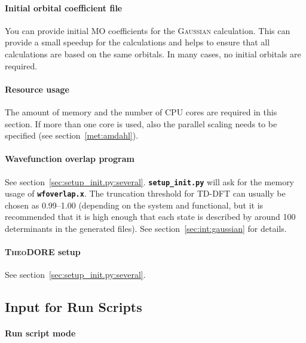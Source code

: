 \documentclass[a4paper,10pt,DIV=15,openany,twoside=false]{scrbook}
\newcommand{\ttt}[1]{\textbf{\texttt{#1}}}
\begin{document}
\paragraph{Initial orbital coefficient file}

You can provide initial MO coefficients for the \textsc{Gaussian} calculation. This can provide a small speedup for the calculations and helps to ensure that all calculations are based on the same orbitals.
In many cases, no initial orbitals are required.

\paragraph{Resource usage}

The amount of memory and the number of CPU cores are required in this section. If more than one core is used, also the parallel scaling needs to be specified (see section~\ref{met:amdahl}).

\paragraph{Wavefunction overlap program}

See section~\ref{sec:setup_init.py:several}. \ttt{setup\_init.py} will ask for the memory usage of \ttt{wfoverlap.x}. The truncation threshold for TD-DFT can usually be chosen as 0.99--1.00 (depending on the system and functional, but it is recommended that it is high enough that each state is described by around 100 determinants in the generated files). See section~\ref{sec:int:gaussian} for details.

\paragraph{\textsc{TheoDORE} setup}

See section~\ref{sec:setup_init.py:several}. 


\subsection{Input for Run Scripts}\label{sec:setup_init.py:run}

\paragraph{Run script mode}
\end{document}
